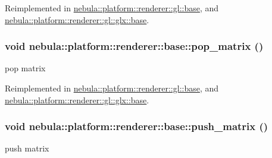 Reimplemented in \hyperlink{classnebula_1_1platform_1_1renderer_1_1gl_1_1base_a31fd2eab976e8d85e0d9ddcf9435b4e8}{nebula::platform::renderer::gl::base}, and \hyperlink{classnebula_1_1platform_1_1renderer_1_1gl_1_1glx_1_1base_a3909d992dcbe8ef8af6e221633146c39}{nebula::platform::renderer::gl::glx::base}.\hypertarget{classnebula_1_1platform_1_1renderer_1_1base_a973b0e5edc9ed9b90a4ab2f209794e24}{
\subsubsection[{pop\_\-matrix}]{\setlength{\rightskip}{0pt plus 5cm}void nebula::platform::renderer::base::pop\_\-matrix ()}}
\label{classnebula_1_1platform_1_1renderer_1_1base_a973b0e5edc9ed9b90a4ab2f209794e24}


pop matrix 

Reimplemented in \hyperlink{classnebula_1_1platform_1_1renderer_1_1gl_1_1base_a090d8f0a4b385b23d1576c43ea27e22e}{nebula::platform::renderer::gl::base}, and \hyperlink{classnebula_1_1platform_1_1renderer_1_1gl_1_1glx_1_1base_aa01b481132d930627aecfa43080c1527}{nebula::platform::renderer::gl::glx::base}.\hypertarget{classnebula_1_1platform_1_1renderer_1_1base_a6e3c0756670cb17a277b7e0ab0bab5a1}{
\subsubsection[{push\_\-matrix}]{\setlength{\rightskip}{0pt plus 5cm}void nebula::platform::renderer::base::push\_\-matrix ()}}
\label{classnebula_1_1platform_1_1renderer_1_1base_a6e3c0756670cb17a277b7e0ab0bab5a1}


push matrix 

